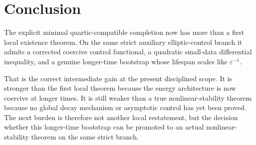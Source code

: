\documentclass[11pt]{article}
\begin{document}
\section{Conclusion}

The explicit minimal quartic-compatible completion now has more than a first local existence theorem. On the same strict auxiliary elliptic-control branch it admits a corrected coercive control functional, a quadratic small-data differential inequality, and a genuine longer-time bootstrap whose lifespan scales like \(\varepsilon^{-1}\).

That is the correct intermediate gain at the present disciplined scope. It is stronger than the first local theorem because the energy architecture is now coercive at longer times. It is still weaker than a true nonlinear-stability theorem because no global decay mechanism or asymptotic control has yet been proved. The next burden is therefore not another local restatement, but the decision whether this longer-time bootstrap can be promoted to an actual nonlinear-stability theorem on the same strict branch.
\end{document}
